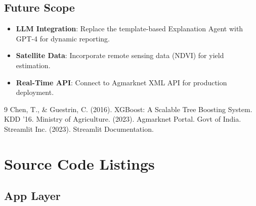 \documentclass[a4paper,12pt]{report}
\begin{document}
\section{Future Scope}
\begin{itemize}
    \item \textbf{LLM Integration}: Replace the template-based Explanation Agent with GPT-4 for dynamic reporting.
    \item \textbf{Satellite Data}: Incorporate remote sensing data (NDVI) for yield estimation.
    \item \textbf{Real-Time API}: Connect to Agmarknet XML API for production deployment.
\end{itemize}

\begin{thebibliography}{9}
 Chen, T., \& Guestrin, C. (2016). XGBoost: A Scalable Tree Boosting System. KDD '16.
 Ministry of Agriculture. (2023). Agmarknet Portal. Govt of India.
 Streamlit Inc. (2023). Streamlit Documentation.
\end{thebibliography}

\appendix
\chapter{Source Code Listings}
\label{app:code}

\section{App Layer}
\end{document}
